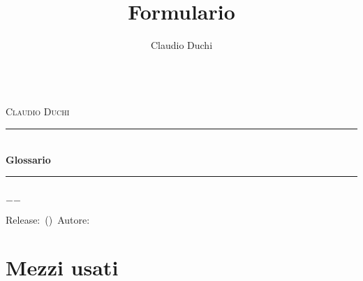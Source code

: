 \documentclass[a4paper,oneside]{book}%
\title{Formulario}
\author{Claudio Duchi}
\date{\datetime}
\makeatletter
\newcommand{\HRule}{\rule{\linewidth}{0.5mm}}
\renewcommand\frontmatter{%
 	\cleardoublepage
 	\@mainmatterfalse
 }
\renewcommand\mainmatter{%
 	\cleardoublepage
 	\@mainmattertrue
 }
\makeatother
\begin{document}
		\frontmatter
		\hypersetup{pageanchor=false}
		\begin{titlepage}\parindent=0pt
			\centering
	\begin{center}
	\Lgrandedue\\[1cm]
	\textsc{\LARGE Claudio Duchi}\\[1.2cm]
	\HRule \\[0.4cm]
	{ \huge \bfseries Glossario}\\[0.4cm]
	\HRule \\[1.2cm]
	\vfill
	{\large $-$\DTMnow$-$}	
\end{center}
{\centering
	Release:\gitReln\ (\gitAbbrevHash)\ Autore:\gitAuthorName\ 
	\gitCommitterDate \\
}
		\end{titlepage}

\frontmatter
		\CDcopyright
		\tableofcontents
			\mainmatter
\cleardoublepage
\glsaddall	
\twocolumn
\printglossaries
\onecolumn		
\nocite{*}
\printbibliography
\appendix
\chapter{Mezzi usati}
\CDMezziUsati
\end{document}
